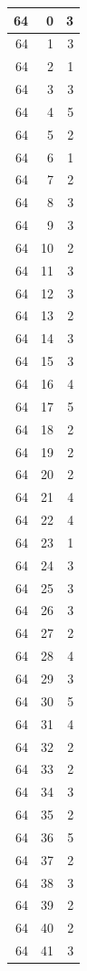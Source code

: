 \documentclass{article}
\begin{document}
\begin{multicols}{2}
{\begin{longtable}{|r|r|r|}
\hline 64 & 0 & 3 \\ 
\hline 64 & 1 & 3 \\ 
\hline 64 & 2 & 1 \\ 
\hline 64 & 3 & 3 \\ 
\hline 64 & 4 & 5 \\ 
\hline 64 & 5 & 2 \\ 
\hline 64 & 6 & 1 \\ 
\hline 64 & 7 & 2 \\ 
\hline 64 & 8 & 3 \\ 
\hline 64 & 9 & 3 \\ 
\hline 64 & 10 & 2 \\ 
\hline 64 & 11 & 3 \\ 
\hline 64 & 12 & 3 \\ 
\hline 64 & 13 & 2 \\ 
\hline 64 & 14 & 3 \\ 
\hline 64 & 15 & 3 \\ 
\hline 64 & 16 & 4 \\ 
\hline 64 & 17 & 5 \\ 
\hline 64 & 18 & 2 \\ 
\hline 64 & 19 & 2 \\ 
\hline 64 & 20 & 2 \\ 
\hline 64 & 21 & 4 \\ 
\hline 64 & 22 & 4 \\ 
\hline 64 & 23 & 1 \\ 
\hline 64 & 24 & 3 \\ 
\hline 64 & 25 & 3 \\ 
\hline 64 & 26 & 3 \\ 
\hline 64 & 27 & 2 \\ 
\hline 64 & 28 & 4 \\ 
\hline 64 & 29 & 3 \\ 
\hline 64 & 30 & 5 \\ 
\hline 64 & 31 & 4 \\ 
\hline 64 & 32 & 2 \\ 
\hline 64 & 33 & 2 \\ 
\hline 64 & 34 & 3 \\ 
\hline 64 & 35 & 2 \\ 
\hline 64 & 36 & 5 \\ 
\hline 64 & 37 & 2 \\ 
\hline 64 & 38 & 3 \\ 
\hline 64 & 39 & 2 \\ 
\hline 64 & 40 & 2 \\ 
\hline 64 & 41 & 3 \\ 

\end{longtable}}
\end{multicols}
\end{document}
